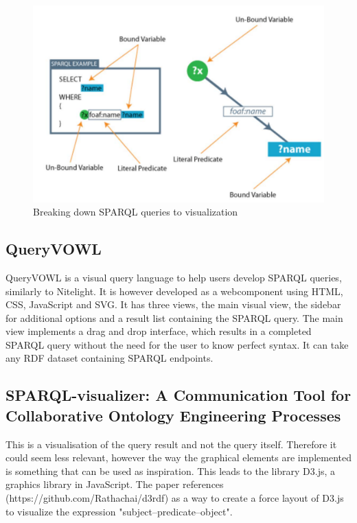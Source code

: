 \begin{figure}[h]
    \centering
  \includegraphics[width=.9\linewidth]{NitelightFigure2.pdf}
  \caption{Breaking down SPARQL queries to visualization\cite{Nitelight}}
  \label{fig:NitelightBreakDown}
\end{figure}

\subsection{QueryVOWL}
QueryVOWL is a visual query language to help users develop SPARQL queries\cite{QueryVOWL}, similarly to Nitelight. It is however developed as a webcomponent using HTML, CSS, JavaScript and SVG. It has three views, the main visual view, the sidebar for additional options and a result list containing the SPARQL query. The main view implements a drag and drop interface, which results in a completed SPARQL query without the need for the user to know perfect syntax. It can take any RDF dataset containing SPARQL endpoints.

\subsection{SPARQL-visualizer: A Communication Tool for Collaborative Ontology Engineering Processes}
This is a visualisation of the query result\cite{MadsHoltenSPARQL} and not the query itself. Therefore it could seem less relevant, however the way the graphical elements are implemented is something that can be used as inspiration. This leads to the library D3.js, a graphics library in JavaScript. The paper references (https://github.com/Rathachai/d3rdf) as a way to create a force layout of D3.js to visualize the expression "subject–predicate–object".



